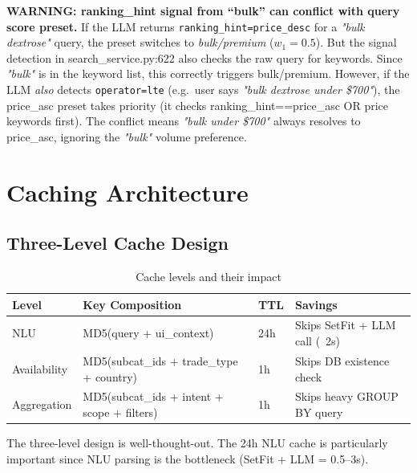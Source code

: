 \documentclass[12pt,a4paper]{article}
\begin{document}
\begin{warnBox}
\textbf{WARNING: ranking\_hint signal from ``bulk'' can conflict with query score preset.}
If the LLM returns \texttt{ranking\_hint=price\_desc} for a \textit{"bulk dextrose"} query,
the preset switches to \textit{bulk/premium} ($w_1=0.5$). But the signal detection
in search\_service.py:622 also checks the raw query for keywords. Since \textit{"bulk"}
is in the keyword list, this correctly triggers bulk/premium. However, if the LLM
\textit{also} detects \texttt{operator=lte} (e.g.\ user says \textit{"bulk dextrose under \$700"}),
the price\_asc preset takes priority (it checks ranking\_hint==price\_asc OR price keywords
first). The conflict means \textit{"bulk under \$700"} always resolves to price\_asc,
ignoring the \textit{"bulk"} volume preference.
\end{warnBox}

\section{Caching Architecture}

\subsection{Three-Level Cache Design}

\begin{table}[H]
\centering
\renewcommand{\arraystretch}{1.3}
\begin{tabularx}{\textwidth}{lXll}
\toprule
\textbf{Level} & \textbf{Key Composition} & \textbf{TTL} & \textbf{Savings} \\
\midrule
NLU & MD5(query + ui\_context) & 24h & Skips SetFit + LLM call (~2s) \\
Availability & MD5(subcat\_ids + trade\_type + country) & 1h & Skips DB existence check \\
Aggregation & MD5(subcat\_ids + intent + scope + filters) & 1h & Skips heavy GROUP BY query \\
\bottomrule
\end{tabularx}
\caption{Cache levels and their impact}
\end{table}

\begin{okBox}
The three-level design is well-thought-out. The 24h NLU cache is particularly important
since NLU parsing is the bottleneck (SetFit + LLM = 0.5--3s).
\end{okBox}
\end{document}
